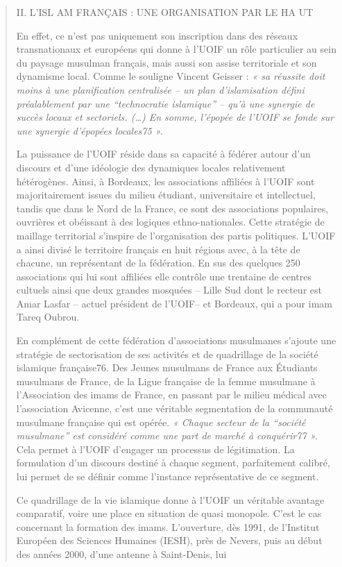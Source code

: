 \begin{quote}
II. L'ISL AM FRANÇAIS : UNE ORGANISATION PAR LE HA UT

En effet, ce n'est pas uniquement son inscription dans des réseaux
transnationaux et européens qui donne à l'UOIF un rôle particulier au
sein du paysage musulman français, mais aussi son assise territoriale et
son dynamisme local. Comme le souligne Vincent Geisser : \emph{« sa
réussite doit moins à une planification centralisée -- un plan
d'islamisation défini préalablement par une ``technocratie islamique''
-- qu'à une synergie de succès locaux et sectoriels. (\ldots) En somme,
l'épopée de l'UOIF se fonde sur une synergie d'épopées locales75 ».}

La puissance de l'UOIF réside dans sa capacité à fédérer autour d'un
discours et d'une idéologie des dynamiques locales relativement
hétérogènes. Ainsi, à Bordeaux, les associations affiliées à l'UOIF sont
majoritairement issues du milieu étudiant, universitaire et
intellectuel, tandis que dans le Nord de la France, ce sont des
associations populaires, ouvrières et obéissant à des logiques
ethno-nationales. Cette stratégie de maillage territorial s'inspire de
l'organisation des partis politiques. L'UOIF a ainsi divisé le
territoire français en huit régions avec, à la tête de chacune, un
représentant de la fédération. En sus des quelques 250 associations qui
lui sont affiliées elle contrôle une trentaine de centres cultuels ainsi
que deux grandes mosquées -- Lille Sud dont le recteur est Amar Lasfar
-- actuel président de l'UOIF-- et Bordeaux, qui a pour imam Tareq
Oubrou.

En complément de cette fédération d'associations musulmanes s'ajoute une
stratégie de sectorisation de ses activités et de quadrillage de la
société islamique française76. Des Jeunes musulmans de France aux
Étudiants musulmans de France, de la Ligue française de la femme
musulmane à l'Association des imams de France, en passant par le milieu
médical avec l'association Avicenne, c'est une véritable segmentation de
la communauté musulmane française qui est opérée. \emph{« Chaque secteur
de la ``société musulmane'' est considéré comme une part de marché à
conquérir77 ».} Cela permet à l'UOIF d'engager un processus de
légitimation. La formulation d'un discours destiné à chaque segment,
parfaitement calibré, lui permet de se définir comme l'instance
représentative de ce segment.

Ce quadrillage de la vie islamique donne à l'UOIF un véritable avantage
comparatif, voire une place en situation de quasi monopole. C'est le cas
concernant la formation des imams. L'ouverture, dès 1991, de l'Institut
Européen des Sciences Humaines (IESH), près de Nevers, puis au début des
années 2000, d'une antenne à Saint-Denis, lui


\end{quote}
